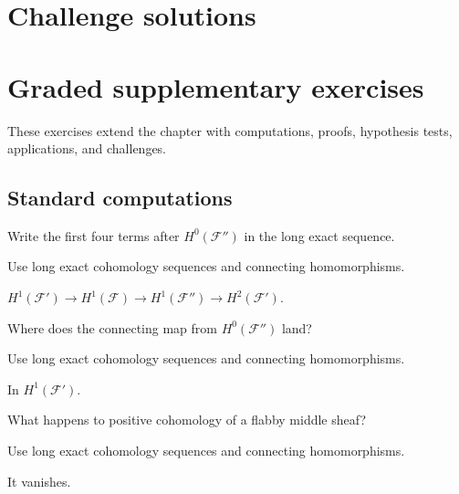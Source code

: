 \ifdefined\IncludeChallengeSolutions
\section{Challenge solutions}

\fi
\section{Graded supplementary exercises}
These exercises extend the chapter with computations, proofs, hypothesis tests, applications, and challenges.

\subsection*{Standard computations}

\begin{exercise}\label{exr:vi48-expand-01}
Write the first four terms after $H^0(\mathcal F'')$ in the long exact sequence.
\end{exercise}
\begin{hint}
Use long exact cohomology sequences and connecting homomorphisms.
\end{hint}
\begin{solution}
$H^1(\mathcal F')\to H^1(\mathcal F)\to H^1(\mathcal F'')\to H^2(\mathcal F')$.
\end{solution}

\begin{exercise}\label{exr:vi48-expand-02}
Where does the connecting map from $H^0(\mathcal F'')$ land?
\end{exercise}
\begin{hint}
Use long exact cohomology sequences and connecting homomorphisms.
\end{hint}
\begin{solution}
In $H^1(\mathcal F')$.
\end{solution}

\begin{exercise}\label{exr:vi48-expand-03}
What happens to positive cohomology of a flabby middle sheaf?
\end{exercise}
\begin{hint}
Use long exact cohomology sequences and connecting homomorphisms.
\end{hint}
\begin{solution}
It vanishes.
\end{solution}

